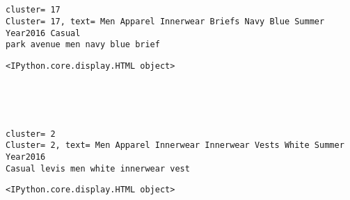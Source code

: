 \documentclass[11pt]{article}
\begin{document}
    
    \begin{center}
    \end{center}
    { \hspace*{\fill} \\}
    
    \begin{center}
    \end{center}
    { \hspace*{\fill} \\}
    
    \begin{Verbatim}[commandchars=\\\{\}]
cluster= 17
Cluster= 17, text= Men Apparel Innerwear Briefs Navy Blue Summer Year2016 Casual
park avenue men navy blue brief
    \end{Verbatim}

    
    \begin{Verbatim}[commandchars=\\\{\}]
<IPython.core.display.HTML object>
    \end{Verbatim}

    
    \begin{center}
    \end{center}
    { \hspace*{\fill} \\}
    
    \begin{center}
    \end{center}
    { \hspace*{\fill} \\}
    
    \begin{Verbatim}[commandchars=\\\{\}]
cluster= 2
Cluster= 2, text= Men Apparel Innerwear Innerwear Vests White Summer Year2016
Casual levis men white innerwear vest
    \end{Verbatim}

    
    \begin{Verbatim}[commandchars=\\\{\}]
<IPython.core.display.HTML object>
    \end{Verbatim}
\end{document}
